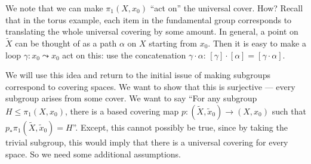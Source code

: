 \documentclass[a4paper]{article}
\begin{document}
We note that we can make $\pi_1(X, x_0)$ ``act on'' the universal cover. How? Recall that in the torus example, each item in the fundamental group corresponds to translating the whole universal covering by some amount. In general, a point on $\tilde{X}$ can be thought of as a path $\alpha$ on $X$ starting from $x_0$. Then it is easy to make a loop $\gamma: x_0 \leadsto x_0$ act on this: use the concatenation $\gamma\cdot \alpha$: $[\gamma]\cdot [\alpha] = [\gamma \cdot \alpha]$.
\begin{center}
\end{center}
We will use this idea and return to the initial issue of making subgroups correspond to covering spaces. We want to show that this is surjective --- every subgroup arises from some cover. We want to say ``For any subgroup $H \leq \pi_1(X, x_0)$, there is a based covering map $p: (\tilde{X}, \tilde{x}_0)\to (X, x_0)$ such that $p_* \pi_1(\tilde{X}, \tilde{x}_0) = H$''. Except, this cannot possibly be true, since by taking the trivial subgroup, this would imply that there is a universal covering for every space. So we need some additional assumptions.
\end{document}
